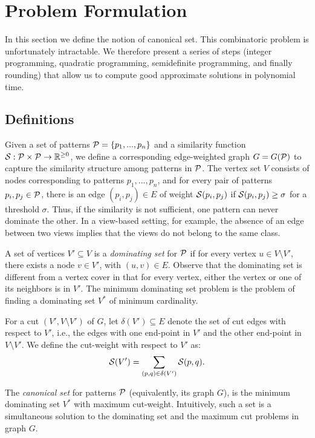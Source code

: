 \documentclass{ieee}
\def\P{{\cal P}}
\def\S{{\cal S}}
\def\SR{{\mathbb{R}}}
\begin{document}
\section{Problem Formulation}
\label{sec:form}
%
\vspace{-0.1in}
In this section we define the notion of canonical set.  This
combinatoric problem is unfortunately intractable.  We therefore
present a series of steps (integer programming, quadratic programming,
semidefinite programming, and finally rounding) that allow us to
compute good approximate solutions in polynomial time.
\vspace{-0.1in}
\subsection{Definitions}
\vspace{-0.1in}
Given a set of patterns $\P=\{p_1,...,p_n\}$ and a similarity function
$\S:\P\times\P\rightarrow \SR^{\ge 0}$, we define a corresponding
edge-weighted graph $G=G(\P)$ to capture the similarity structure
among patterns in $\P$.  The vertex set $V$ consists of nodes
corresponding to patterns $p_1,...,p_n$, and for every pair of
patterns $p_i,p_j\in \P$, there is an edge $(p_i,p_j)\in E$ of weight
$\S(p_i,p_j)$ if $\S(p_i,p_j)\ge \sigma$ for a threshold $\sigma$.
Thus, if the similarity is not sufficient, one pattern can never
dominate the other.  In a view-based setting, for example, the absence
of an edge between two views implies that the views do not belong to
the same class.
  
  A set of vertices $V'\subseteq V$ is a {\em
  dominating set} for $\P$ if for every vertex $u\in V\setminus V'$,
there exists a node $v\in V'$, with $(u,v)\in E$.  Observe that the
dominating set is different from a vertex cover in that for every
vertex, either the vertex or one of its neighbors is in $V'$.  The
minimum dominating set problem is the problem of finding a dominating
set $V^*$ of minimum cardinality.

For  a cut $(V',V\setminus  V')$ of  $G$, let  $\delta(V')\subseteq E$
denote the set of cut edges with respect to $V'$, i.e., the edges with
one end-point in $V'$ and  the other end-point in $V\setminus V'$.  We
define the cut-weight with respect to $V'$ as: 
$$\S(V')=\sum_{(p,q)\in  \delta(V')}  \S(p,q).$$

The {\em  canonical set} for patterns $\P$ (equivalently, 
its graph  $G$), is the  minimum dominating set $V^*$  with maximum
cut-weight.  Intuitively,  such a set  is a simultaneous  solution to
the dominating set and the maximum cut problems in graph $G$.\\
\end{document}
